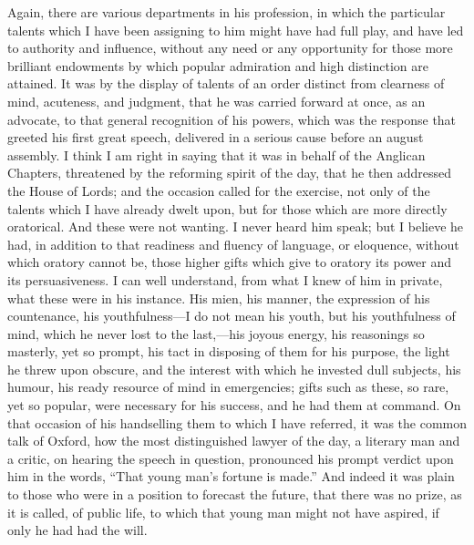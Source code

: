 Again, there are various departments in his
profession, in which the particular talents which I have
been assigning to him might have had full play, and have
led to authority and influence, without any need or any
opportunity for those more brilliant endowments by which
popular admiration and high distinction are attained. It
was by the display of talents of an order distinct from
clearness of mind, acuteness, and judgment, that he was
carried forward at once, as an advocate, to that general
recognition of his powers, which was the response that
greeted his first great speech, delivered in a serious
cause before an august assembly. I think I am right in
saying that it was in behalf of the Anglican Chapters,
threatened by the reforming spirit of the day, that he
then addressed the House of Lords; and the occasion
called for the exercise, not only of the talents which I
have already dwelt upon, but for those which are more
directly oratorical. And these were not wanting. I never
heard him speak; but I believe he had, in addition to
that readiness and fluency of language, or eloquence,
without which oratory cannot be, those higher gifts which
give to oratory its power and its persuasiveness. I can
well understand, from what I knew of him in private, what
these were in his instance. His mien, his manner, the
expression of his countenance, his youthfulness—I do
not mean his youth, but his youthfulness of mind, which
he never lost to the last,—his joyous energy, his
reasonings so masterly, yet so prompt, his tact in
disposing of them for his purpose, the light he threw
upon obscure, and the interest with which he invested
dull subjects, his humour, his ready resource of mind in
emergencies; gifts such as these, so rare, yet so
popular, were necessary for his success, and he had them
at command. On that occasion of his handselling them to
which I have referred, it was the common talk of Oxford,
how the most distinguished lawyer of the day, a literary
man and a critic, on hearing the speech in question,
pronounced his prompt verdict upon him in the words,
``That young man's fortune is made.'' And indeed
it was plain to those who were in a position to forecast
the future, that there was no prize, as it is called, of
public life, to which that young man might not have
aspired, if only he had had the will.

